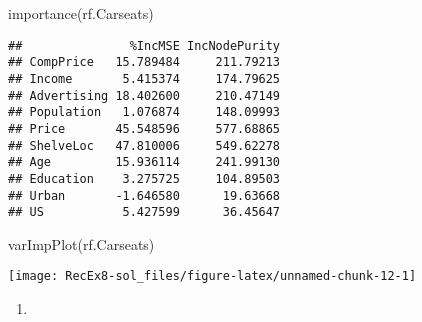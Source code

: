 \documentclass[
]{article}
\newenvironment{Shaded}{\begin{snugshade}}{\end{snugshade}}
\newcommand{\AttributeTok}[1]{\textcolor[rgb]{0.77,0.63,0.00}{#1}}
\newcommand{\DecValTok}[1]{\textcolor[rgb]{0.00,0.00,0.81}{#1}}
\newcommand{\FloatTok}[1]{\textcolor[rgb]{0.00,0.00,0.81}{#1}}
\newcommand{\FunctionTok}[1]{\textcolor[rgb]{0.00,0.00,0.00}{#1}}
\newcommand{\NormalTok}[1]{#1}
\newcommand{\OtherTok}[1]{\textcolor[rgb]{0.56,0.35,0.01}{#1}}
\newcommand{\SpecialCharTok}[1]{\textcolor[rgb]{0.00,0.00,0.00}{#1}}
\newcommand{\StringTok}[1]{\textcolor[rgb]{0.31,0.60,0.02}{#1}}
\providecommand{\tightlist}{%
  \setlength{\itemsep}{0pt}\setlength{\parskip}{0pt}}
\begin{document}
\begin{Shaded}
\begin{Highlighting}[]
\FunctionTok{importance}\NormalTok{(rf.Carseats)}
\end{Highlighting}
\end{Shaded}

\begin{verbatim}
##               %IncMSE IncNodePurity
## CompPrice   15.789484     211.79213
## Income       5.415374     174.79625
## Advertising 18.402600     210.47149
## Population   1.076874     148.09993
## Price       45.548596     577.68865
## ShelveLoc   47.810006     549.62278
## Age         15.936114     241.99130
## Education    3.275725     104.89503
## Urban       -1.646580      19.63668
## US           5.427599      36.45647
\end{verbatim}

\begin{Shaded}
\begin{Highlighting}[]
\FunctionTok{varImpPlot}\NormalTok{(rf.Carseats)}
\end{Highlighting}
\end{Shaded}

\texttt{[image: RecEx8-sol\_files/figure-latex/unnamed-chunk-12-1]}

\begin{enumerate}
\def\labelenumi{\alph{enumi})}
\setcounter{enumi}{5}
\tightlist
\item
\end{enumerate}

\begin{Shaded}
\end{Shaded}
\end{document}
